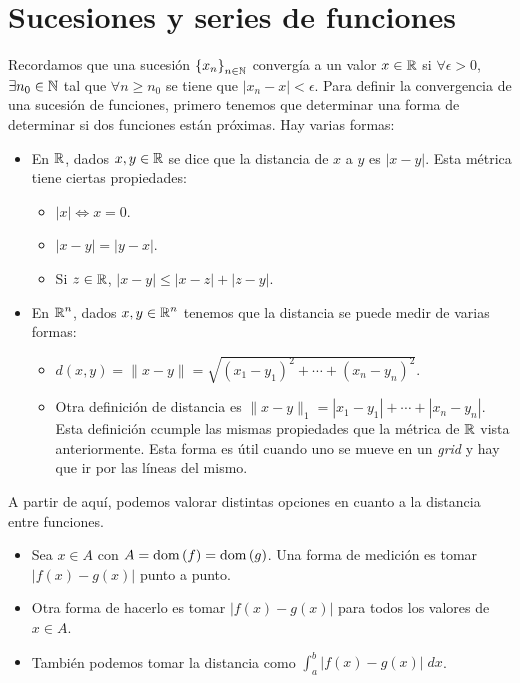 \chapter{Sucesiones y series de funciones}
Recordamos que una sucesión $\displaystyle \left\{ x_{n}\right\} _{n\in\mathbb{N}} $ convergía a un valor $\displaystyle x \in \mathbb{R} $ si $\displaystyle \forall \epsilon > 0 $, $\displaystyle \exists n_{0} \in \mathbb{N} $ tal que $\displaystyle \forall n \geq n_{0} $ se tiene que $\displaystyle \left|x_{n}-x\right|<\epsilon  $. Para definir la convergencia de una sucesión de funciones, primero tenemos que determinar una forma de determinar si dos funciones están próximas. Hay varias formas:
\begin{itemize}
\item En $\displaystyle \mathbb{R} $, dados $\displaystyle x,y \in \mathbb{R} $ se dice que la distancia de $\displaystyle x $ a $\displaystyle y $ es $\displaystyle \left|x-y\right| $. Esta métrica tiene ciertas propiedades:
	\begin{itemize}
	\item  $\displaystyle \left|x\right| \iff x = 0 $.
	\item $\displaystyle \left|x-y\right| = \left|y-x\right| $.
	\item Si $\displaystyle z \in \mathbb{R} $, $\displaystyle \left|x-y\right| \leq \left|x-z\right| + \left|z - y\right| $.
	\end{itemize}
\item En $\displaystyle \mathbb{R}^{n} $, dados $\displaystyle x, y \in \mathbb{R}^{n} $ tenemos que la distancia se puede medir de varias formas:
	\begin{itemize}
	\item $\displaystyle d\left(x,y\right) = \|x - y \| = \sqrt{\left(x_{1}-y_{1}\right)^{2} + \cdots + \left(x_{n}-y_{n}\right)^{2}} $.
	\item Otra definición de distancia es $\displaystyle \|x-y\|_{1} = \left|x_{1}-y_{1}\right|+ \cdots + \left|x_{n}-y_{n}\right| $. Esta definición ccumple las mismas propiedades que la métrica de $\displaystyle \mathbb{R} $ vista anteriormente. Esta forma es útil cuando uno se mueve en un \textit{grid} y hay que ir por las líneas del mismo.
	\end{itemize}
\end{itemize}
A partir de aquí, podemos valorar distintas opciones en cuanto a la distancia entre funciones.
\begin{itemize}
\item Sea $\displaystyle x \in A $ con $\displaystyle A = \operatorname{dom}\left(f\right) = \operatorname{dom}\left(g\right) $. Una forma de medición es tomar $\displaystyle \left|f\left(x\right)-g\left(x\right)\right| $ punto a punto.
\item Otra forma de hacerlo es tomar $\displaystyle \left|f\left(x\right)-g\left(x\right)\right| $ para todos los valores de $\displaystyle x \in A $.
\item También podemos tomar la distancia como $\displaystyle \int^{b}_{a} \left|f\left(x\right)-g\left(x\right)\right| \; dx $.
\end{itemize}
